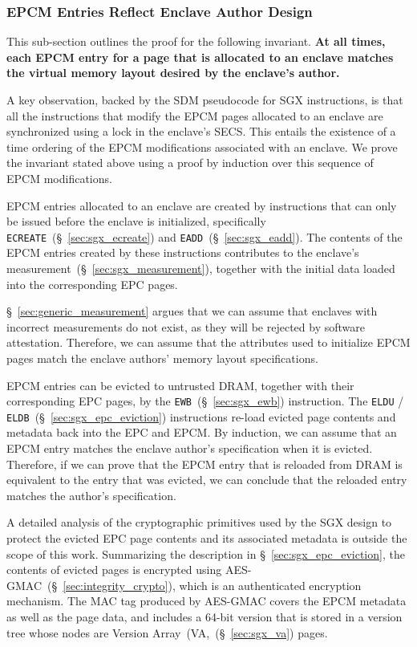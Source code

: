 \subsubsection{EPCM Entries Reflect Enclave Author Design}

This sub-section outlines the proof for the following invariant. \textbf{At
all times, each EPCM entry for a page that is allocated to an enclave matches
the virtual memory layout desired by the enclave's author.}

A key observation, backed by the SDM pseudocode for SGX instructions, is that
all the instructions that modify the EPCM pages allocated to an enclave are
synchronized using a lock in the enclave's SECS. This entails the existence of
a time ordering of the EPCM modifications associated with an enclave. We prove
the invariant stated above using a proof by induction over this sequence of
EPCM modifications.

EPCM entries allocated to an enclave are created by instructions that can only
be issued before the enclave is initialized, specifically
\texttt{ECREATE}~(\S~\ref{sec:sgx_ecreate}) and
\texttt{EADD}~(\S~\ref{sec:sgx_eadd}). The contents of the EPCM entries created
by these instructions contributes to the enclave's
measurement~(\S~\ref{sec:sgx_measurement}), together with the initial data
loaded into the corresponding EPC pages.

\S~\ref{sec:generic_measurement} argues that we can assume that enclaves with
incorrect measurements do not exist, as they will be rejected by software
attestation. Therefore, we can assume that the attributes used to initialize
EPCM pages match the enclave authors' memory layout specifications.

EPCM entries can be evicted to untrusted DRAM, together with their
corresponding EPC pages, by the \texttt{EWB}~(\S~\ref{sec:sgx_ewb})
instruction.  The \texttt{ELDU} / \texttt{ELDB}~(\S~\ref{sec:sgx_epc_eviction})
instructions re-load evicted page contents and metadata back into the EPC and
EPCM. By induction, we can assume that an EPCM entry matches the enclave
author's specification when it is evicted. Therefore, if we can prove that the
EPCM entry that is reloaded from DRAM is equivalent to the entry that was
evicted, we can conclude that the reloaded entry matches the author's
specification.

A detailed analysis of the cryptographic primitives used by the SGX design to
protect the evicted EPC page contents and its associated metadata is outside
the scope of this work. Summarizing the description in
\S~\ref{sec:sgx_epc_eviction}, the contents of evicted pages is encrypted using
AES-GMAC~(\S~\ref{sec:integrity_crypto}), which is an authenticated encryption
mechanism. The MAC tag produced by AES-GMAC covers the EPCM metadata as well as
the page data, and includes a 64-bit version that is stored in a version tree
whose nodes are Version Array~(VA,~(\S~\ref{sec:sgx_va}) pages.

